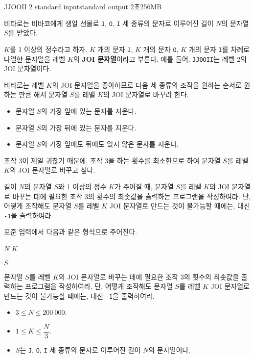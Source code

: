 \begin{problem}{JJOOII 2}
	{standard input}{standard output}
	{2초}{256MB}{}
	
	비타로는 비바코에게 생일 선물로 \texttt{J}, \texttt{O}, \texttt{I} 세 종류의 문자로 이루어진 길이 $N$의 문자열 $S$를 받았다.
	
	$K$를 1 이상의 정수라고 하자. $K$ 개의 문자 \texttt{J}, $K$ 개의 문자 \texttt{O}, $K$ 개의 문자 \texttt{I}를 차례로 나열한 문자열을 레벨 $K$의 \textbf{JOI 문자열}이라고 부른다. 예를 들어, \texttt{JJOOII}는 레벨 2의 JOI 문자열이다.
	
	비타로는 레벨 $K$의 JOI 문자열을 좋아하므로 다음 세 종류의 조작을 원하는 순서로 원하는 만큼 해서 문자열 $S$를 레벨 $K$의 JOI 문자열로 바꾸려 한다.
	
	\begin{itemize}
		\item[조작 1] 문자열 $S$의 가장 앞에 있는 문자를 지운다.
		\item[조작 2] 문자열 $S$의 가장 뒤에 있는 문자를 지운다.
		\item[조작 3] 문자열 $S$의 가장 앞에도 뒤에도 있지 않은 문자를 지운다.
	\end{itemize}

	조작 3이 제일 귀찮기 때문에, 조작 3을 하는 횟수를 최소한으로 하여 문자열 $S$를 레벨 $K$의 JOI 문자열로 바꾸고 싶다.
	
	길이 $N$의 문자열 $S$와 1 이상의 정수 $K$가 주어질 때, 문자열 $S$를 레벨 $K$의 JOI 문자열로 바꾸는 데에 필요한 조작 3의 횟수의 최솟값을 출력하는 프로그램을 작성하여라. 단, 어떻게 조작해도 문자열 $S$를 레벨 $K$ JOI 문자열로 만드는 것이 불가능할 때에는, 대신 \texttt{-1}을 출력하여라.
	
	
	\InputFile
	
	표준 입력에서 다음과 같은 형식으로 주어진다.

	$N$ $K$
	
	$S$
	
	\OutputFile
	
	문자열 $S$를 레벨 $K$의 JOI 문자열로 바꾸는 데에 필요한 조작 3의 횟수의 최솟값을 출력하는 프로그램을 작성하여라. 단, 어떻게 조작해도 문자열 $S$를 레벨 $K$ JOI 문자열로 만드는 것이 불가능할 때에는, 대신 \texttt{-1}을 출력하여라.
	
	
	\Constraints
	
	\begin{itemize}
	\item $3 \le N \le 200\ 000$.
	\item $1 \le K \le \dfrac{N}{3}$.
	\item $S$는 \texttt{J}, \texttt{O}, \texttt{I} 세 종류의 문자로 이루어진 길이 $N$의 문자열이다.
	\end{itemize}
	

\end{problem}

